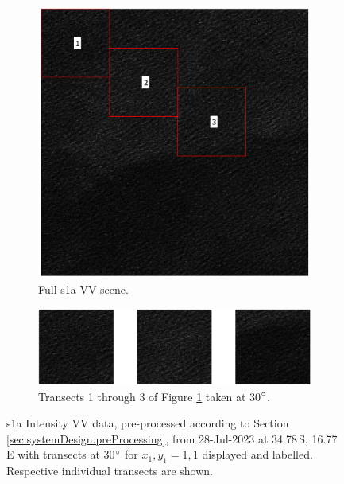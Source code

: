 \begin{figure}[H]
    \centering
    \begin{subfigure}{0.65\linewidth}
        \centering
        \includegraphics[width=\linewidth]{Figures/PipelineDesign/VVSceneWTransects.pdf}
        \caption{Full \acs{s1a} VV scene.}
        \label{fig:systemDesign.transectSample.full}
    \end{subfigure}   
    \begin{subfigure}{0.95\linewidth}
        \centering    
        \includegraphics[width=\linewidth]{Figures/PipelineDesign/VVAllTransects.pdf}
        \caption{Transects 1 through 3 of Figure \ref{fig:systemDesign.transectSample.full} taken at 30$\degree$.}
        \label{fig:systemDesign.transectSample.all}        
    \end{subfigure}
    \caption{\acs{s1a} Intensity VV data, pre-processed according to Section \ref{sec:systemDesign.preProcessing}, from 28-Jul-2023 at 34.78\,S, 16.77\,E with transects at 30$\degree$ for $x_{1},y_{1} = 1,1$ displayed and labelled. Respective individual transects are shown.}
    \label{fig:systemDesign.transectSample}
\end{figure}
